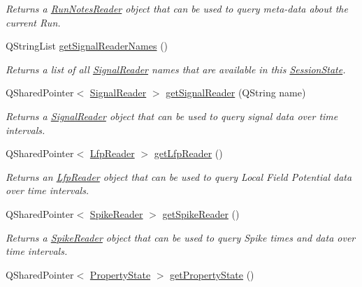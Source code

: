 \begin{DoxyCompactItemize}
\begin{DoxyCompactList}\small\item\em Returns a \hyperlink{class_picto_1_1_run_notes_reader}{Run\-Notes\-Reader} object that can be used to query meta-\/data about the current Run. \end{DoxyCompactList}\item 
Q\-String\-List \hyperlink{class_picto_1_1_session_state_afcd6c7eaa6c7725240820da6eeac0834}{get\-Signal\-Reader\-Names} ()
\begin{DoxyCompactList}\small\item\em Returns a list of all \hyperlink{class_picto_1_1_signal_reader}{Signal\-Reader} names that are available in this \hyperlink{class_picto_1_1_session_state}{Session\-State}. \end{DoxyCompactList}\item 
Q\-Shared\-Pointer$<$ \hyperlink{class_picto_1_1_signal_reader}{Signal\-Reader} $>$ \hyperlink{class_picto_1_1_session_state_a1815b7ea410896c0c0432d27076fc508}{get\-Signal\-Reader} (Q\-String name)
\begin{DoxyCompactList}\small\item\em Returns a \hyperlink{class_picto_1_1_signal_reader}{Signal\-Reader} object that can be used to query signal data over time intervals. \end{DoxyCompactList}\item 
Q\-Shared\-Pointer$<$ \hyperlink{class_picto_1_1_lfp_reader}{Lfp\-Reader} $>$ \hyperlink{class_picto_1_1_session_state_a36f6a97f5ae7f43904c3d4edcd057382}{get\-Lfp\-Reader} ()
\begin{DoxyCompactList}\small\item\em Returns an \hyperlink{class_picto_1_1_lfp_reader}{Lfp\-Reader} object that can be used to query Local Field Potential data over time intervals. \end{DoxyCompactList}\item 
\hypertarget{class_picto_1_1_session_state_a54a0565232e64f631f0252122a10b3ba}{Q\-Shared\-Pointer$<$ \hyperlink{class_picto_1_1_spike_reader}{Spike\-Reader} $>$ \hyperlink{class_picto_1_1_session_state_a54a0565232e64f631f0252122a10b3ba}{get\-Spike\-Reader} ()}\label{class_picto_1_1_session_state_a54a0565232e64f631f0252122a10b3ba}

\begin{DoxyCompactList}\small\item\em Returns a \hyperlink{class_picto_1_1_spike_reader}{Spike\-Reader} object that can be used to query Spike times and data over time intervals. \end{DoxyCompactList}\item 
\hypertarget{class_picto_1_1_session_state_aca3e7642ab317720e552daedf31cf0f9}{Q\-Shared\-Pointer$<$ \hyperlink{class_picto_1_1_property_state}{Property\-State} $>$ \hyperlink{class_picto_1_1_session_state_aca3e7642ab317720e552daedf31cf0f9}{get\-Property\-State} ()}\label{class_picto_1_1_session_state_aca3e7642ab317720e552daedf31cf0f9}


\end{DoxyCompactItemize}
